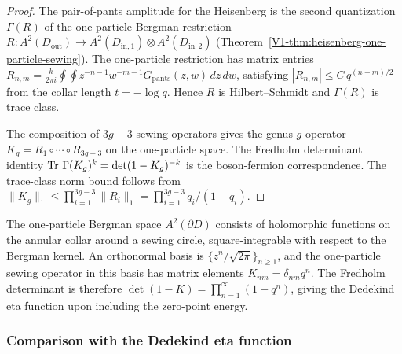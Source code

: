 \begin{proof}
The pair-of-pants amplitude for the Heisenberg is the second quantization $\Gamma(R)$ of the one-particle Bergman restriction $R \colon A^2(D_{\mathrm{out}}) \to A^2(D_{\mathrm{in},1}) \otimes A^2(D_{\mathrm{in},2})$ (Theorem~\ref{V1-thm:heisenberg-one-particle-sewing}). The one-particle restriction has matrix entries $R_{n,m} = \frac{k}{2\pi i} \oint\oint z^{-n-1}w^{-m-1}G_{\mathrm{pants}}(z,w)\,dz\,dw$, satisfying $|R_{n,m}| \leq C\,q^{(n+m)/2}$ from the collar length $t = -\log q$. Hence $R$ is Hilbert--Schmidt and $\Gamma(R)$ is trace class.

The composition of $3g - 3$ sewing operators gives the genus-$g$ operator $K_g = R_1 \circ \cdots \circ R_{3g-3}$ on the one-particle space. The Fredholm determinant identity $\operatorname{Tr}\,\Gamma(K_g)^k = \det(1 - K_g)^{-k}$ is the boson-fermion correspondence. The trace-class norm bound follows from $\|K_g\|_1 \leq \prod_{i=1}^{3g-3} \|R_i\|_1 = \prod_{i=1}^{3g-3} q_i/(1-q_i)$.
\end{proof}

\begin{remark}
The one-particle Bergman space $A^2(\partial D)$ consists of holomorphic functions on the annular collar around a sewing circle, square-integrable with respect to the Bergman kernel. An orthonormal basis is $\{z^n / \sqrt{2\pi}\}_{n \geq 1}$, and the one-particle sewing operator in this basis has matrix elements $K_{nm} = \delta_{nm} q^n$. The Fredholm determinant is therefore $\det(1 - K) = \prod_{n=1}^\infty (1 - q^n)$, giving the Dedekind eta function upon including the zero-point energy.
\end{remark}

\subsubsection{Comparison with the Dedekind eta function}


